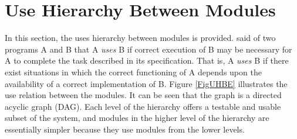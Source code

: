 \documentclass[12pt, titlepage]{article}
\newcommand{\acref}[1]{AC\ref{#1}}
\newcommand{\mref}[1]{M\ref{#1}}
\begin{document}

\section{Use Hierarchy Between Modules} \label{SecUse}

In this section, the uses hierarchy between modules is
provided. \citet{Parnas1978} said of two programs A and B that A {\em uses} B if
correct execution of B may be necessary for A to complete the task described in
its specification. That is, A {\em uses} B if there exist situations in which
the correct functioning of A depends upon the availability of a correct
implementation of B.  Figure \ref{FigUHBE} illustrates the use relation between
the modules. It can be seen that the graph is a directed acyclic graph
(DAG). Each level of the hierarchy offers a testable and usable subset of the
system, and modules in the higher level of the hierarchy are essentially simpler
because they use modules from the lower levels.





\end{document}
